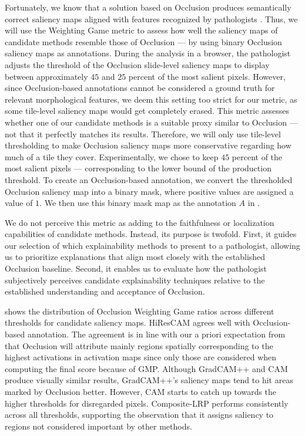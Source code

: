 Fortunately, we know that a solution based on Occlusion produces semantically correct saliency maps aligned with features recognized by pathologists \cite{gallo}.
Thus, we will use the Weighting Game metric to assess how well the saliency maps of candidate methods resemble those of Occlusion --- by using binary Occlusion saliency maps as annotations.
During the analysis in a browser, the pathologist adjusts the threshold of the Occlusion slide-level saliency maps to display between approximately $45$ and $25$ percent of the most salient pixels.
However, since Occlusion-based annotations cannot be considered a ground truth for relevant morphological features, we deem this setting too strict for our metric, as some tile-level saliency maps would get completely erased.
This metric assesses whether one of our candidate methods is a suitable proxy similar to Occlusion --- not that it perfectly matches its results.
Therefore, we will only use tile-level thresholding to make Occlusion saliency maps more conservative regarding how much of a tile they cover.
Experimentally, we chose to keep $45$ percent of the most salient pixels --- corresponding to the lower bound of the production threshold.
To create an Occlusion-based annotation, we convert the thresholded Occlusion saliency map into a binary mask, where positive values are assigned a value of $1$.
We then use this binary mask map as the annotation $A$ in .

We do not perceive this metric as adding to the faithfulness or localization capabilities of candidate methods.
Instead, its purpose is twofold.
First, it guides our selection of which explainability methods to present to a pathologist, allowing us to prioritize explanations that align most closely with the established Occlusion baseline.
Second, it enables us to evaluate how the pathologist subjectively perceives candidate explainability techniques relative to the established understanding and acceptance of Occlusion.

 shows the distribution of Occlusion Weighting Game ratios across different thresholds for candidate saliency maps.
HiResCAM agrees well with Occlusion-based annotation.
The agreement is in line with our a priori expectation from  that Occlusion will attribute mainly regions spatially corresponding to the highest activations in activation maps since only those are considered when computing the final score because of GMP.
Although GradCAM++ and CAM produce visually similar results, GradCAM++'s saliency maps tend to hit areas marked by Occlusion better.
However, CAM starts to catch up towards the higher thresholds for disregarded pixels.
Composite-LRP performs consistently across all thresholds, supporting the observation that it assigns saliency to regions not considered important by other methods.


